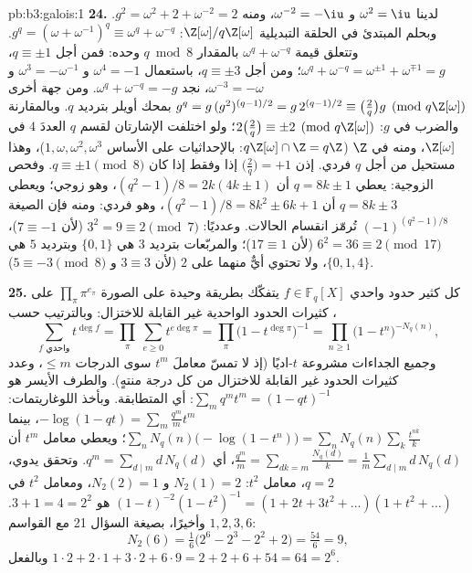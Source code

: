 \begin{solution}{pb:b3:galois:1}
\textbf{24.} لدينا $\omega^2 = \iu$ و $\omega^{-2} = -\iu$، ومنه $g^2 = \omega^2 + 2 + \omega^{-2} = 2$.
وبحلم المبتدئ في الحلقة التبديلية $\Z[\omega]/q\Z[\omega]$: $g^q =
(\omega + \omega^{-1})^q \equiv \omega^q + \omega^{-q}$. وتتعلق قيمة
$\omega^q + \omega^{-q}$ بالمقدار $q \bmod 8$ وحده: فمن أجل $q \equiv \pm1$،
$\omega^q + \omega^{-q} = \omega^{\pm1} +
\omega^{\mp1} = g$؛ ومن أجل $q \equiv \pm3$، باستعمال $\omega^4 =
-1$ و $\omega^{3} = -\omega^{-1}$
و $\omega^{-3} = -\omega$، نجد $\omega^q + \omega^{-q} = -g$. ومن جهة أخرى $g^q =
g\,(g^2)^{(q-1)/2} = g\,2^{(q-1)/2} \equiv \bigl(\frac2q\bigr)
g \pmod{q\Z[\omega]}$ بمحك أويلر
بترديد $q$. وبالمقارنة والضرب في $g$: $2\bigl(\frac2q\bigr) \equiv
\pm2 \pmod{q\Z[\omega]}$؛ ولو اختلفت
الإشارتان لقسم $q$ العددَ $4$ في $\Z[\omega]$، ومنه في $\Z$
($q\Z[\omega] \cap
\Z = q\Z$: بالإحداثيات على الأساس $1, \omega, \omega^2,
\omega^3$)، وهذا مستحيل من أجل
$q$ فردي. إذن $\bigl(\frac2q\bigr) =
+1$ إذا وفقط إذا كان $q \equiv \pm1 \pmod 8$. وفحص الزوجية:
يعطي $q = 8k \pm 1$ أن $(q^2 - 1)/8 = 2k(4k \pm 1)$، وهو زوجي؛ ويعطي $q = 8k \pm 3$
أن $(q^2 - 1)/8 = 8k^2 \pm 6k + 1$، وهو فردي: ومنه فإن الصيغة $(-1)^{(q^2-1)/8}$ تُرمّز انقسام
الحالات. وعدديًا: $3^2
= 9 \equiv 2 \pmod 7$ (لأن $7 \equiv -1$)، $6^2 = 36 \equiv 2
\pmod{17}$ (لأن
$17 \equiv 1$)؛ والمربّعات بترديد $3$ هي $\{0,
1\}$ وبترديد $5$
هي $\{0, 1, 4\}$، ولا تحتوي أيٌّ منهما على $2$ (لأن
$3 \equiv 3$ و $5 \equiv -3 \pmod 8$).

\textbf{25.} كل كثير حدود واحدي $f \in \mathbb F_q[X]$ يتفكّك بطريقة وحيدة على
الصورة $\prod_\pi\pi^{e_\pi}$ على كثيرات الحدود الواحدية غير القابلة للاختزال:
وبالترتيب حسب ،
\[
\sum_{f \text{ واحدي}}t^{\deg f}
= \prod_\pi\ \sum_{e \geq 0}t^{e\deg\pi}
= \prod_\pi\bigl(1 - t^{\deg\pi}\bigr)^{-1}
= \prod_{n \geq 1}\bigl(1 - t^n\bigr)^{-N_q(n)},
\]
وجميع الجداءات مشروعة $t$-اديًا (إذ لا تمسّ معاملَ $t^m$ سوى
الدرجات $\leq m$، وعدد كثيرات الحدود غير القابلة للاختزال من كل
درجة منتهٍ). والطرف الأيسر هو $\sum_m
q^mt^m = (1 - qt)^{-1}$: أي المتطابقة. وبأخذ
اللوغاريتمات: $-\log(1 -
qt) = \sum_m\frac{q^m}mt^m$، بينما $\sum_nN_q(n)\bigl(-\log(1
- t^n)\bigr) = \sum_nN_q(n)\sum_k\frac{t^{nk}}k$؛ ويعطي معامل $t^m$ أن
$\frac{q^m}m = \sum_{dk = m}
\frac{N_q(d)}k = \frac1m\sum_{d \mid m}d\,N_q(d)$، أي $q^m = \sum_{d\mid m}d\,N_q(d)$. وتحقق يدوي، $q = 2$، معامل $t^2$:
$N_2(1) = 2$ و $N_2(2) = 1$، ومعامل $t^2$ في $(1 - t)^{-2}(1 - t^2)^{-1} = (1 + 2t + 3t^2 + \dots)(1 + t^2
+ \dots)$ هو $3 + 1 = 4 = 2^2$.
وأخيرًا، بصيغة السؤال 21 مع القواسم $1, 2, 3, 6$:
\[
N_2(6) = \tfrac16\bigl(2^6 - 2^3 - 2^2 + 2\bigr)
= \tfrac{54}6 = 9,
\]
وبالفعل $1\cdot2 + 2\cdot1 + 3\cdot2 + 6\cdot9 = 2 + 2 +
6 + 54 = 64 = 2^6$.
\end{solution}
